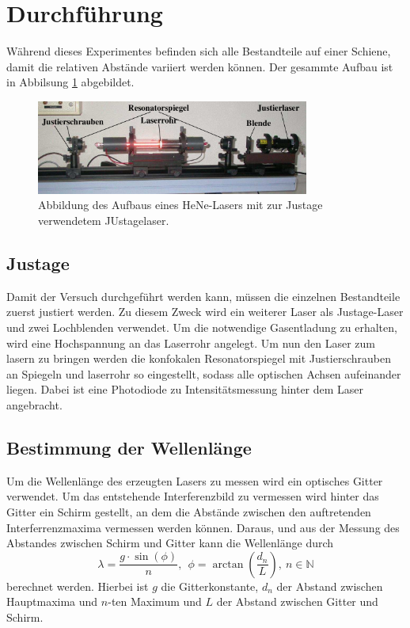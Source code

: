 \newpage
\section{Durchführung}
\label{sec:Durchführung}
Während dieses Experimentes befinden sich alle Bestandteile auf einer Schiene,
damit die relativen Abstände variiert werden können. Der gesammte Aufbau ist in
Abbilsung \ref{fig:Versuchsaufbau1} abgebildet.
\begin{figure}[htb]
  \centering
  \includegraphics[width=0.8\textwidth]{content/aufbau.png}
  \caption{Abbildung des Aufbaus eines HeNe-Lasers mit zur Justage verwendetem JUstagelaser.}
  \label{fig:Versuchsaufbau1}
\end{figure}
\FloatBarrier

\subsection{Justage}

Damit der Versuch durchgeführt
werden kann, müssen die einzelnen Bestandteile zuerst justiert werden. Zu diesem
Zweck wird ein weiterer Laser als Justage-Laser und zwei Lochblenden verwendet.
Um die notwendige Gasentladung zu erhalten, wird eine Hochspannung an das Laserrohr
angelegt. Um nun den Laser zum lasern zu bringen werden die konfokalen
Resonatorspiegel mit Justierschrauben  an Spiegeln und laserrohr so eingestellt,
sodass alle optischen Achsen aufeinander liegen. Dabei ist eine Photodiode zu
Intensitätsmessung hinter dem Laser angebracht.

\subsection{Bestimmung der Wellenlänge}
Um die Wellenlänge
des erzeugten Lasers zu messen wird ein optisches Gitter verwendet.
Um das entstehende Interferenzbild zu vermessen wird hinter das Gitter ein Schirm
gestellt, an dem die Abstände zwischen den auftretenden Interferrenzmaxima vermessen
werden können. Daraus, und aus der Messung des Abstandes zwischen Schirm und Gitter
kann die Wellenlänge durch
\begin{equation}
  \lambda = \frac{g\cdot\sin(\phi)}{n},\ \ \phi = \arctan\left(\frac{d_n}{L}\right),\  n\in\mathds{N}
\end{equation}
berechnet werden. Hierbei ist $g$ die Gitterkonstante, $d_n$ der Abstand zwischen Hauptmaxima
und $n$-ten Maximum und $L$ der Abstand zwischen Gitter und Schirm.


